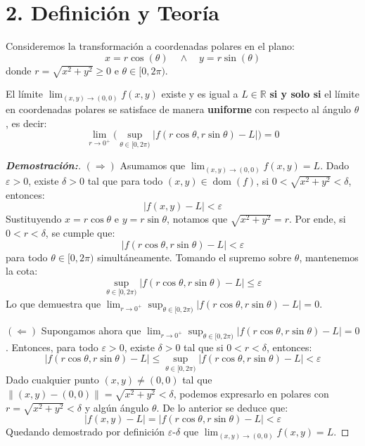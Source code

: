 \documentclass[11pt]{article}
\newenvironment{teoria}{%
  \section*{2. Definición y Teoría}%
}{}
\newenvironment{definicion}[1]{%
  \begin{tcolorbox}[colback=blue!5,colframe=blue!75!black,title=Definición: #1]%
}{%
  \end{tcolorbox}%
}
\begin{document}
\begin{teoria}
  \begin{definicion}{Transformación Polar y Equivalencia de Límite}
    Consideremos la transformación a coordenadas polares en el plano:
    $$ x = r\cos(\theta) \quad \wedge \quad y = r\sin(\theta) $$
    donde $r = \sqrt{x^2+y^2} \ge 0$ e $\theta \in [0, 2\pi)$.
    
    El límite $\displaystyle\lim_{(x,y) \to (0,0)} f(x,y)$ existe y es igual a $L \in \mathbb{R}$ \textbf{si y solo si} el límite en coordenadas polares se satisface de manera \textbf{uniforme} con respecto al ángulo $\theta$, es decir:
    $$ \displaystyle\lim_{r \to 0^+} \Big( \sup_{\theta \in [0, 2\pi)} |f(r\cos\theta, r\sin\theta) - L| \Big) = 0 $$
  \end{definicion}

  \begin{proof}[\textbf{Demostración:}]
    $(\Rightarrow)$ Asumamos que $\displaystyle\lim_{(x,y) \to (0,0)} f(x,y) = L$.
    Dado $\varepsilon > 0$, existe $\delta > 0$ tal que para todo $(x,y) \in \operatorname{dom}(f)$, si $0 < \sqrt{x^2+y^2} < \delta$, entonces:
    $$ |f(x,y) - L| < \varepsilon $$
    Sustituyendo $x = r\cos\theta$ e $y = r\sin\theta$, notamos que $\sqrt{x^2+y^2} = r$. Por ende, si $0 < r < \delta$, se cumple que:
    $$ |f(r\cos\theta, r\sin\theta) - L| < \varepsilon $$
    para todo $\theta \in [0, 2\pi)$ simultáneamente. Tomando el supremo sobre $\theta$, mantenemos la cota:
    $$ \sup_{\theta \in [0, 2\pi)} |f(r\cos\theta, r\sin\theta) - L| \leq \varepsilon $$
    Lo que demuestra que $\displaystyle\lim_{r \to 0^+} \sup_{\theta \in [0, 2\pi)} |f(r\cos\theta, r\sin\theta) - L| = 0$.

    $(\Leftarrow)$ Supongamos ahora que $\displaystyle\lim_{r \to 0^+} \sup_{\theta \in [0, 2\pi)} |f(r\cos\theta, r\sin\theta) - L| = 0$.
    Entonces, para todo $\varepsilon > 0$, existe $\delta > 0$ tal que si $0 < r < \delta$, entonces:
    $$ |f(r\cos\theta, r\sin\theta) - L| \leq \sup_{\theta \in [0, 2\pi)} |f(r\cos\theta, r\sin\theta) - L| < \varepsilon $$
    Dado cualquier punto $(x,y) \neq (0,0)$ tal que $\|(x,y) - (0,0)\| = \sqrt{x^2+y^2} < \delta$, podemos expresarlo en polares con $r = \sqrt{x^2+y^2} < \delta$ y algún ángulo $\theta$. De lo anterior se deduce que:
    $$ |f(x,y) - L| = |f(r\cos\theta, r\sin\theta) - L| < \varepsilon $$
    Quedando demostrado por definición $\varepsilon$-$\delta$ que $\displaystyle\lim_{(x,y) \to (0,0)} f(x,y) = L$.
  \end{proof}

\end{teoria}
\end{document}
